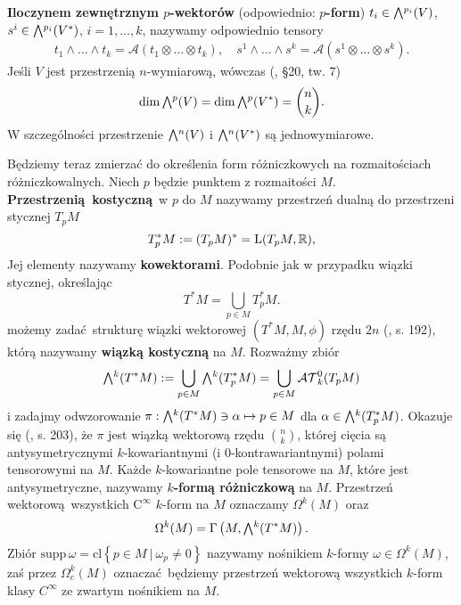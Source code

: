 \textbf{Iloczynem zewnętrznym \(p\)-wektorów} (odpowiednio: \textbf{\(p\)-form}) \(t_i\in\Exterior^{p_i}(V)\), \(s^i\in\Exterior^{p_i}(V^\ast)\), \(i=1,\dots, k\), nazywamy odpowiednio tensory
\begin{align*}
    t_1\wedge\dots\wedge t_k = \mathcal{A}(t_1\otimes \dots \otimes t_k), \quad
    s^1\wedge\dots\wedge s^k = \mathcal{A}(s^1\otimes \dots \otimes s^k).
\end{align*}
Jeśli \(V\) jest przestrzenią \(n\)-wymiarową, wówczas (\cite{herdegen}, §20, tw. 7)
\begin{equation*}
    \mathrm{dim}\,\Exterior^p(V) = \mathrm{dim}\,\Exterior^p(V^\ast) = \binom{n}{k}.
\end{equation*}
W szczególności przestrzenie \(\Exterior^n(V)\) i \(\Exterior^n(V^\ast)\) są jednowymiarowe.

Będziemy teraz zmierzać do określenia form różniczkowych na rozmaitościach różniczkowalnych. Niech \(p\) będzie punktem z rozmaitości \(M\). \textbf{Przestrzenią kostyczną} w \(p\) do \(M\) nazywamy przestrzeń dualną do przestrzeni stycznej \(T_p M\)
\begin{equation*}
    T^\ast_p M := (T_p M)^\ast = \mathrm{L}(T_p M, \mathbb{R}),
\end{equation*}
Jej elementy nazywamy \textbf{kowektorami}. Podobnie jak w przypadku wiązki stycznej, określając
\begin{equation*}
    T^\ast M = \bigcup\limits_{p\in M} T_p^\ast M.
\end{equation*}
możemy zadać strukturę wiązki wektorowej \((T^\ast M, M, \phi)\) rzędu \(2n\) (\cite{tu}, s. 192), którą nazywamy \textbf{wiązką kostyczną} na \(M\).
Rozważmy zbiór
\begin{equation*}
    \Exterior^k(T^\ast M) := \bigcup\limits_{p\in M} \Exterior^k(T^{\ast}_p M) = \bigcup\limits_{p\in M} \mathcal{AT}^0_k(T_p M)
\end{equation*} i zadajmy odwzorowanie \(\pi: \Exterior^k (T^\ast M) \ni \alpha \mapsto p\in M\) dla
\(\alpha \in \Exterior^k(T^{\ast}_p M)\). Okazuje się (\cite{tu}, s. 203), że \(\pi\) jest wiązką wektorową rzędu \(\binom{n}{k}\), której cięcia są antysymetrycznymi \(k\)-kowariantnymi (i \(0\)-kontrawariantnymi) polami tensorowymi na \(M\).
Każde \(k\)-kowariantne pole tensorowe na \(M\), które jest antysymetryczne, nazywamy \textbf{\(k\)-formą różniczkową} na \(M\).
Przestrzeń wektorową wszystkich \(\mathrm{C}^\infty\) \(k\)-form na \(M\) oznaczamy \(\Omega^k(M)\) oraz
\begin{equation*}
    \Omega^k(M)=\Gamma\left(M, \Exterior^k(T^\ast M)\right).
\end{equation*}
Zbiór \(\mathrm{supp}\, \omega = \mathrm{cl}\left\{p\in M \: | \: \omega_p \neq 0\right\}\) nazywamy nośnikiem \(k\)-formy \(\omega\in\Omega^k(M)\), zaś przez \(\Omega^k_c(M)\) oznaczać będziemy przestrzeń wektorową wszystkich \(k\)-form klasy \(C^\infty\) ze zwartym nośnikiem na \(M\).

